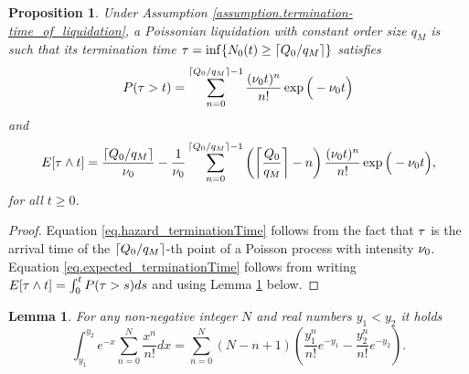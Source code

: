 \documentclass[10pt]{article}
\newtheorem{prop}[thm]{Proposition}
\newtheorem{lemma}[thm]{Lemma}
\begin{document}
\begin{prop}\label{prop.terminationTime_poisson_and_constant-size}
 Under Assumption \ref{assumption.termination-time_of_liquidation}, a Poissonian liquidation with constant order size $q_{M}$ is such that its termination time $\terminationTime=\inf\lbrace \countingProc[0](t)\geq \lceil \metaorderSize / q_{M}\rceil \rbrace$ satisfies 
 \begin{equation}\label{eq.hazard_terminationTime}
  \Prob(\terminationTime >t ) 
  =
  \sum_{n=0}^{\lceil \metaorderSize / q_{M} \rceil -1 }
  \frac{(\baseRate_0 t)^{n}}{n!}\exp \Big(-\baseRate_{0} t \Big)
 \end{equation}
and 
\begin{equation}\label{eq.expected_terminationTime}
 \Expectation [\terminationTime \wedge t ]
 =
 \frac{\lceil \metaorderSize / q_{M} \rceil}{\baseRate_0}
 - \frac{1}{\baseRate_{0}}
  \sum_{n=0}^{\lceil \metaorderSize / q_{M} \rceil -1 }
  \left( \left\lceil \frac{\metaorderSize}{q_{M}}\right\rceil - n \right) 
  \frac{(\baseRate_0 t)^{n}}{n!}\exp \Big(-\baseRate_{0} t \Big),
\end{equation}
for all $t\geq 0$.
\end{prop}
\begin{proof}
 Equation \eqref{eq.hazard_terminationTime} follows from the fact that $\terminationTime$ is the arrival time of the $\lceil \metaorderSize/q_{M} \rceil$-th point of a Poisson process with  intensity $\baseRate_{0}$. Equation \eqref{eq.expected_terminationTime} follows from writing $
  \Expectation[\terminationTime \wedge t ] = 
  \intzerot \Prob(\terminationTime > s ) ds
 $
 and using Lemma \ref{lemma.expected_terminationTime} below.
\end{proof}
\begin{lemma}\label{lemma.expected_terminationTime}
 For any non-negative integer $N$ and real numbers $y_1<y_2$ it holds
 \begin{equation*}
  \int_{y_1}^{y_2}
  e^{-x}\sum_{n=0}^{N} \frac{x^{n}}{n!}dx
  =
  \sum_{n=0}^{N}
  (N-n+1)
  \left(
  \frac{y_{1}^{n}}{n!} e^{-y_1} -  \frac{y_{2}^{n}}{n!} e^{-y_2} 
  \right).
 \end{equation*}
\end{lemma}
\end{document}
